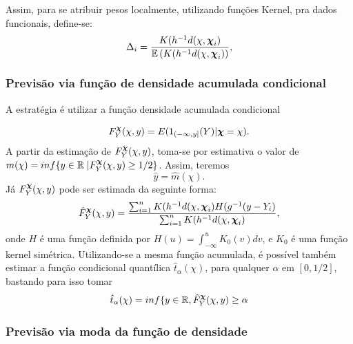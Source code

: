 \documentclass[
	12pt,				%
	openright,			%
	oneside,			%
	a4paper,			%
	english,			%
	brazil				%
	]{dissertacao-ufrgs-abntex2}
\begin{document}
Assim, para se atribuir pesos localmente, utilizando funções Kernel, pra dados funcionais, define-se:
\begin{equation} \label{peso-local}
\Delta_i=\frac{K(h^{-1}d(\chi,\boldsymbol{\chi}_{i})}{\mathbb{E} \left( K(h^{-1}d(\chi,\boldsymbol{\chi}_{i}) \right)},
\end{equation}



\subsubsection*{Previsão via função de densidade acumulada condicional}

A estratégia é utilizar a função densidade acumulada condicional

\begin{equation} \label{fd-acum}
F_{Y}^{\boldsymbol{\chi}}(\chi,y)=E(1_{(-\infty,y]}(Y)|\boldsymbol{\chi}=\chi).
\end{equation}
A partir da estimação de $F_{Y}^{\boldsymbol{\chi}}(\chi,y)$, toma-se por estimativa
o valor de $m(\chi)=inf\{y\in\mathbb{R\mid}F_{Y}^{\boldsymbol{\chi}}(\chi,y)\geq1/2\}$.
Assim, teremos 
\[
\hat{y}=\hat{m}(\chi).
\]
Já $F_{Y}^{\boldsymbol{\chi}}(\chi,y)$ pode ser estimada da seguinte forma:
\begin{equation}
\hat{F}_{Y}^{\boldsymbol{\chi}}(\chi,y)=\frac{\sum_{i=1}^{n}K(h^{-1}d(\chi,\boldsymbol{\chi}_{i})H(g^{-1}(y-Y_{i})}{\sum_{i=1}^{n}K(h^{-1}d(\chi,\boldsymbol{\chi}_{i})},
\end{equation}
onde $H$ é uma função definida por $H(u)=\int_{-\infty}^{u}K_{0}(v)dv$,
e $K_{0}$ é uma função kernel simétrica.
Utilizando-se a mesma função acumulada, é possível também estimar a função condicional quantílica $\hat{t}_{\alpha}(\chi)$, para qualquer $\alpha$ em $[0,1/2]$, bastando para isso tomar
\begin{equation}
\hat{t}_{\alpha}(\chi)=inf\{y\in\mathbb{R},\hat{F}_{Y}^{\boldsymbol{\chi}}(\chi,y)\geq\alpha
\end{equation}


\subsubsection*{Previsão via moda da função de densidade}
\end{document}
